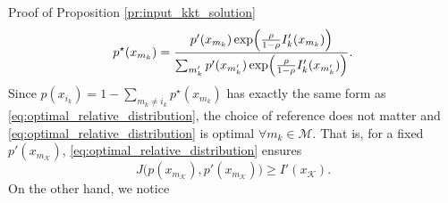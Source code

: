 \documentclass[journal]{IEEEtran}
\begin{document}
\begin{appendix}
\begin{subsection}{Proof of Proposition \ref{pr:input_kkt_solution}}
		\begin{equation}
			p^\star(x_{m_k}) = \frac{p'(x_{m_k}) \exp \Bigl( \frac{\rho}{1 - \rho} I_k'(x_{m_k}) \Bigr)}{\sum_{m_k'} p'(x_{m_k'}) \exp \Bigl( \frac{\rho}{1 - \rho} I_k'(x_{m_k'}) \Bigr)}.
			\label{eq:optimal_relative_distribution}
		\end{equation}
		Since $p(x_{i_k}) = 1 - \sum_{m_k \ne i_k} p^\star(x_{m_k})$ has exactly the same form as \eqref{eq:optimal_relative_distribution}, the choice of reference does not matter and \eqref{eq:optimal_relative_distribution} is optimal $\forall m_k \in \mathcal{M}$.
		That is, for a fixed $p'(x_{m_{\mathcal{K}}})$, \eqref{eq:optimal_relative_distribution} ensures
		\begin{equation}
			J \bigl( p(x_{m_{\mathcal{K}}}),p'(x_{m_{\mathcal{K}}}) \bigr) \ge I'(x_{\mathcal{K}}).
			\label{eq:information_difference_lower}
		\end{equation}
		On the other hand, we notice
		\begin{subequations}

\end{subequations}
\end{subsection}
\end{appendix}
\end{document}
